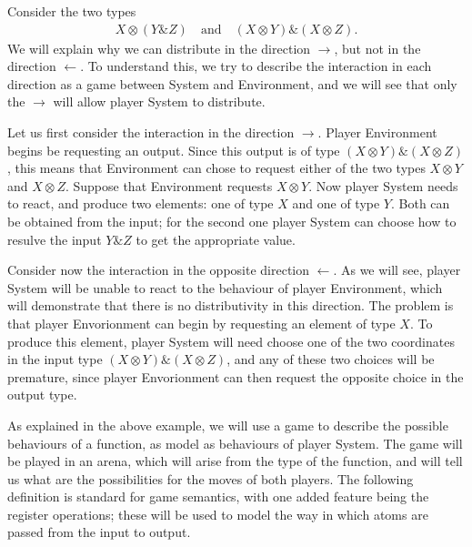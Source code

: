 \begin{example} 
    Consider the two types 
    \begin{align*}
        X \otimes (Y \& Z) 
        \quad \text{and} \quad
        (X \otimes Y) \& (X \otimes Z).
    \end{align*}
    We will explain why we can distribute in the direction $\rightarrow$, but not in the direction $\leftarrow$. To understand this, we try to describe the interaction in each direction as a game between System and Environment, and we will see that only the $\rightarrow$ will allow player System to distribute.

    Let us first consider the interaction in the  direction $\rightarrow$. Player Environment begins be requesting an output. Since this output is of type $(X \otimes Y) \& (X \otimes Z)$, this means that Environment can chose to request either of the two types  $X \otimes Y$ and $X \otimes Z$. Suppose that Environment requests $X \otimes Y$. Now player System needs to react, and produce two elements: one of type $X$ and one of type $Y$. Both can be obtained from the input; for the second one player System can choose how to resulve the input $Y \& Z$ to get the appropriate value. 

    Consider now the interaction in the opposite direction $\leftarrow$. As we will see, player System will be unable to react to the behaviour of player Environment, which will demonstrate that there is no distributivity in this direction. The problem is that player Envorionment can begin by requesting an element of type $X$. To produce this element, player System will need  choose one of the two coordinates in the input type $(X \otimes Y) \& (X \otimes Z)$, and any of these two  choices will be premature, since player Envorionment can then request the opposite choice in the output type. 
\end{example}

As explained in the above example, we will use a game to describe the possible behaviours of a function, as model as behaviours of player System. The game will be played in an arena, which will arise from the type of the function, and will tell us what are the possibilities for the moves of both players. The following definition is standard for game semantics, with one added feature being the register operations; these will be used to model the way in which atoms are passed from the input to output. 

